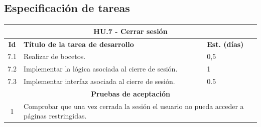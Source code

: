 \subsection{Especificación de tareas}

\begin{table}[H]
	\centering
\begin{tabular}{|c|p{9.5cm}|p{1cm}|}
	\hline
	\multicolumn{3}{|c|}{\textbf{HU.7 - Cerrar sesión}} \\
	\hline
	\textbf{Id} & \textbf{Título de la tarea de desarrollo} & \textbf{Est. (días)} \\
	\hline
	7.1 & Realizar de bocetos. & 0,5 \\ \hline
	7.2 &  Implementar la lógica asociada al cierre de sesión. & 1 \\ \hline
	7.3 &  Implementar interfaz asociada al cierre de sesión. & 0.5 \\ \hline
	\multicolumn{3}{|c|}{\textbf{Pruebas de aceptación}} \\ \hline
	1 & \multicolumn{2}{|p{10cm}|}{Comprobar que una vez cerrada la sesión el usuario no pueda acceder a páginas restringidas.} \\ \hline
\end{tabular}
\end{table}

